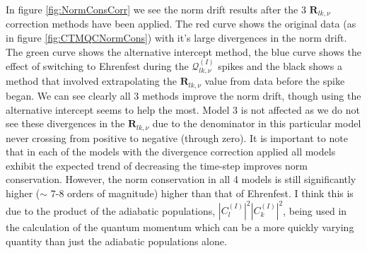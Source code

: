 In figure \ref{fig:NormConsCorr} we see the norm drift results after the 3 $\mathbf{R}_{lk, \nu}$ correction methods have been applied. The red curve shows the original data (as in figure \ref{fig:CTMQCNormCons}) with it's large divergences in the norm drift. The green curve shows the alternative intercept method, the blue curve shows the effect of switching to Ehrenfest during the $\mathcal{Q}_{lk, \nu}^{(I)}$ spikes and the black shows a method that involved extrapolating the $\mathbf{R}_{lk, \nu}$ value from data before the spike began. We can see clearly all 3 methods improve the norm drift, though using the alternative intercept seems to help the most. Model 3 is not affected as we do not see these divergences in the $\mathbf{R}_{lk, \nu}$ due to the denominator in this particular model never crossing from positive to negative (through zero). It is important to note that in each of the models with the divergence correction applied all models exhibit the expected trend of decreasing the time-step improves norm conservation. However, the norm conservation in all 4 models is still significantly higher ($\sim$ 7-8 orders of magnitude) higher than that of Ehrenfest. I think this is due to the product of the adiabatic populations, $|C_{l}^{(I)}|^2 |C_{k}^{(I)}|^2$, being used in the calculation of the quantum momentum which can be a more quickly varying quantity than just the adiabatic populations alone.

